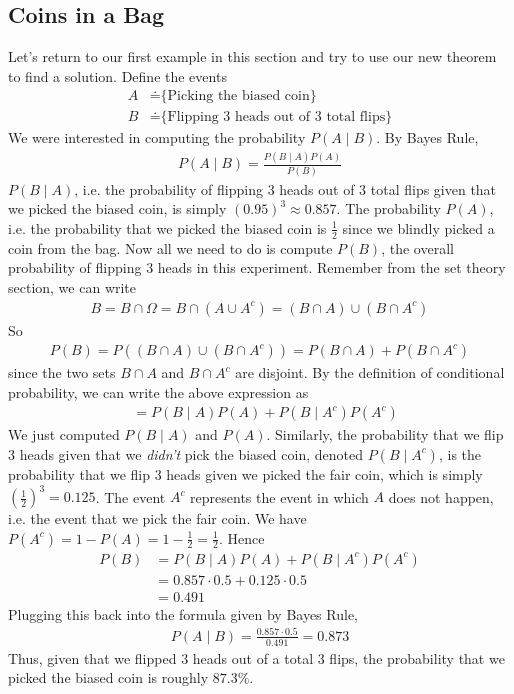 \documentclass{tufte-book}
\theoremstyle{definition}
\numberwithin{theorem}{section}
\numberwithin{definition}{section}
\numberwithin{lemma}{section}
\numberwithin{corollary}{section}
\numberwithin{proposition}{section}
\numberwithin{remark}{section}
\numberwithin{claim}{section}
\numberwithin{observation}{section}
\numberwithin{fact}{section}
\numberwithin{assumption}{section}
\numberwithin{example}{section}
\numberwithin{exercise}{section}
\begin{document}
\subsection{Coins in a Bag}
Let's return to our first example in this section and try to use our new theorem to find a solution. Define the events
\begin{align*}
A &\doteq \text{\{Picking the biased coin\}} \\
B &\doteq \text{\{Flipping 3 heads out of 3 total flips\}}
\end{align*}
We were interested in computing the probability $P(A \mid B)$. By Bayes Rule,
\begin{align*}
P(A \mid B) = \frac{P(B \mid A) P(A)}{P(B)}
\end{align*}
$P(B \mid A)$, i.e. the probability of flipping 3 heads out of 3 total flips given that we picked the biased coin, is simply $(0.95)^3 \approx 0.857$. The probability $P(A)$, i.e. the probability that we picked the biased coin is $\frac{1}{2}$ since we blindly picked a coin from the bag. Now all we need to do is compute $P(B)$, the overall probability of flipping 3 heads in this experiment. Remember from the set theory section, we can write
\begin{align*}
B = B \cap \Omega = B \cap (A \cup A^c) = (B \cap A) \cup (B \cap A^c)
\end{align*}
So
\begin{align*}
P(B) = P((B \cap A) \cup (B \cap A^c)) = P(B \cap A) + P(B \cap A^c)
\end{align*}
since the two sets $B \cap A$ and $B \cap A^c$ are disjoint. By the definition of conditional probability, we can write the above expression as
\begin{align*}
&= P(B \mid A) P(A) + P(B \mid A^c) P(A^c)
\end{align*}
We just computed $P(B \mid A)$ and $P(A)$. Similarly, the probability that we flip 3 heads given that we \textit{didn't} pick the biased coin, denoted $P(B \mid A^c)$, is the probability that we flip 3 heads given we picked the fair coin, which is simply $(\frac{1}{2})^3 = 0.125$. The event $A^c$ represents the event in which $A$ does not happen, i.e. the event that we pick the fair coin. We have $P(A^c) = 1 - P(A) = 1 - \frac{1}{2} = \frac{1}{2}$. Hence
\begin{align*}
P(B) &= P(B \mid A) P(A) + P(B \mid A^c) P(A^c) \\
&= 0.857 \cdot 0.5 + 0.125 \cdot 0.5 \\
&= 0.491
\end{align*}
Plugging this back into the formula given by Bayes Rule,
\begin{align*}
P(A \mid B) = \frac{0.857 \cdot 0.5}{0.491} = 0.873
\end{align*}
Thus, given that we flipped 3 heads out of a total 3 flips, the probability that we picked the biased coin is roughly $87.3\%$.
\end{document}
